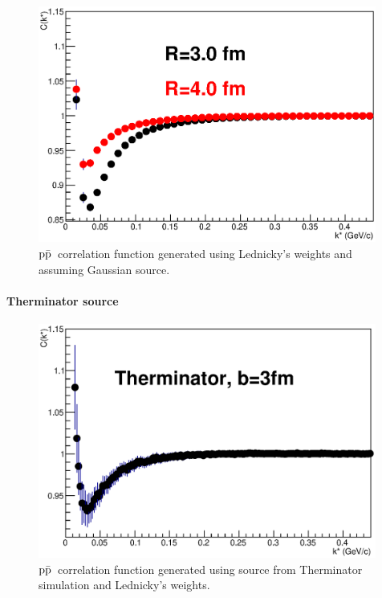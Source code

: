 \documentclass[ALICE,manyauthors]{ALICE_analysis_notes}
\newcommand{\pap}{$\rm p\bar{\rm p}$}
\begin{document}
\begin{figure}[]
   \centering
   \includegraphics[width=0.99\textwidth]{pics/pap.eps}
   \caption{\pap~correlation function generated using Lednicky's weights and assuming Gaussian source.}
   \label{fig:cfpapgaus}
 \end{figure}

\paragraph{Therminator source}

\begin{figure}[]
   \centering
   \includegraphics[width=0.99\textwidth]{pics/paptherm.eps}
   \caption{\pap~correlation function generated using source from Therminator simulation and Lednicky's weights.}
   \label{fig:cfpaptherm}
 \end{figure}
\end{document}
